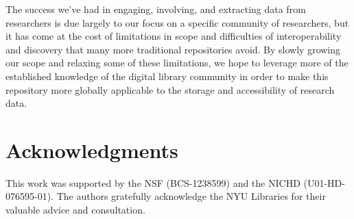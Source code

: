 \documentclass{sig-alternate}
\begin{document}
The success we've had in engaging, involving, and extracting data from researchers is due largely to our focus on a specific community of researchers, but it has come at the cost of limitations in scope and difficulties of interoperability and discovery that many more traditional repositories avoid.
By slowly growing our scope and relaxing some of these limitations, we hope to leverage more of the established knowledge of the digital library community in order to make this repository more globally applicable to the storage and accessibility of research data.

\section*{Acknowledgments}

This work was supported by the NSF (BCS-1238599) and the NICHD (U01-HD-076595-01).
The authors gratefully acknowledge the NYU Libraries for their valuable advice and consultation.



\end{document}
